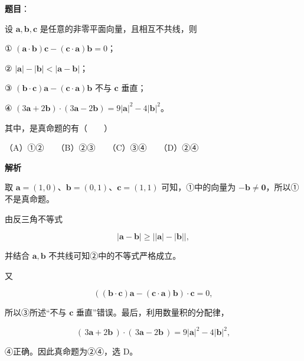 \begin{answer}

\textbf{题目}：

设 $\boldsymbol a,\boldsymbol b,\boldsymbol c$ 是任意的非零平面向量，且相互不共线，则

① $(\boldsymbol a\cdot\boldsymbol b)\boldsymbol c-(\boldsymbol c\cdot\boldsymbol a)\boldsymbol b=0$；

② $|\boldsymbol a|-|\boldsymbol b|<|\boldsymbol a-\boldsymbol b|$；

③ $(\boldsymbol b\cdot\boldsymbol c)\boldsymbol a-(\boldsymbol c\cdot\boldsymbol a)\boldsymbol b$ 不与 $\boldsymbol c$ 垂直；

④ $(3\boldsymbol a+2\boldsymbol b)\cdot(3\boldsymbol a-2\boldsymbol b)=9|\boldsymbol a|^2-4|\boldsymbol b|^2$。

其中，是真命题的有\mbox{（　　）}

（A）①②　　（B）②③　　（C）③④　　（D）②④

\textbf{解析}

取 $\boldsymbol a=(1,0)$、$\boldsymbol b=(0,1)$、$\boldsymbol c=(1,1)$ 可知，①中的向量为 $-\boldsymbol b\ne\boldsymbol0$，所以①不是真命题。

由反三角不等式

\nopagebreak[4]
\[
|\boldsymbol a-\boldsymbol b|\ge\bigl||\boldsymbol a|-|\boldsymbol b|\bigr|,
\]

并结合 $\boldsymbol a,\boldsymbol b$ 不共线可知②中的不等式严格成立。

又

\nopagebreak[4]
\[
\left((\boldsymbol b\cdot\boldsymbol c)\boldsymbol a-(\boldsymbol c\cdot\boldsymbol a)\boldsymbol b\right)\cdot\boldsymbol c=0,
\]

所以③所述“不与 $\boldsymbol c$ 垂直”错误。最后，利用数量积的分配律，

\nopagebreak[4]
\[
(\,3\boldsymbol a+2\boldsymbol b\,)\cdot(\,3\boldsymbol a-2\boldsymbol b\,)
=9|\boldsymbol a|^2-4|\boldsymbol b|^2,
\]

④正确。因此真命题为②④，选 D。


\end{answer}
